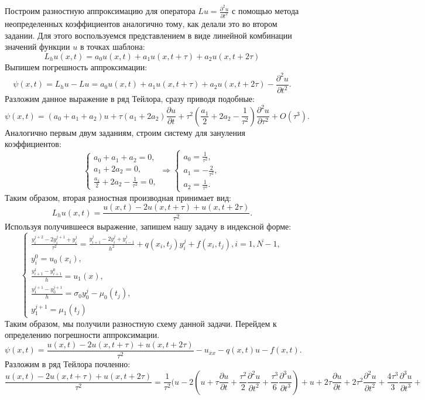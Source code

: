 \documentclass[11pt]{article}
\begin{document}
Построим разностную аппроксимацию для оператора $Lu=\frac{\partial^2 u}{\partial t^2}$ с помощью метода неопределенных коэффициентов аналогично тому, как делали это во втором задании. Для этого воспользуемся представлением в виде линейной комбинации значений функции $u$ в точках шаблона:
$$L_h u(x,t)=a_0u(x,t)+a_1u(x,t+\tau)+a_2u(x,t+2\tau)$$
Выпишем погрешность аппроксимации:
$$\psi(x,t)=L_hu-Lu=a_0u(x,t)+a_1u(x,t+\tau)+a_2u(x,t+2\tau)-\frac{\partial^2 u}{\partial t^2}.$$
Разложим данное выражение в ряд Тейлора, сразу приводя подобные:
$$\psi(x,t)=(a_0+a_1+a_2)u+\tau(a_1+2a_2)\frac{\partial u}{\partial t}+\tau^2(\frac{a_1}{2}+2a_2-\frac{1}{\tau^2})\frac{\partial^2 u}{\partial \tau^2}+O(\tau^3).$$
Аналогично первым двум заданиям, строим систему для зануления коэффициентов:
$$\begin{cases}
    a_0+a_1+a_2=0,\\
    a_1+2a_2=0,\\
    \frac{a_1}{2}+2a_2-\frac{1}{\tau^2}=0,
\end{cases}\Rightarrow
\begin{cases}
    a_0=\frac{1}{\tau^2},\\
    a_1=-\frac{2}{\tau^2},\\
    a_2=\frac{1}{\tau^2}.
\end{cases}$$
Таким образом, вторая разностная производная принимает вид:
$$L_hu(x,t)=\frac{u(x,t)-2u(x,t+\tau)+u(x,t+2\tau)}{\tau^2}.$$
Используя получившееся выражение, запишем нашу задачу в индексной форме:
$$\begin{cases}
    \frac{y_i^{j+2}-2y_i^{j+1}+y_{i}^j}{\tau^2}=\frac{y_{i+1}^j-2y_i^j+y_{i-1}^j}{h^2}+q(x_i,t_j)y_i^j+f(x_i,t_j),i=\overline{1,N-1},\\
    y_i^0=u_0(x_i),\\
    \frac{y_{i+1}^1-y_{i+1}^0}{h}=u_1(x),\\
    \frac{y_{1}^{j+1}-y_{0}^{j+1}}{h}=\sigma_0 y_0^{j}-\mu_0(t_j),\\
    y_{1}^{j+1}=\mu_1(t_j)
\end{cases}$$
Таким образом, мы получили разностную схему данной задачи. Перейдем к определению погрешности аппроксимации.
$$\psi(x,t)=\frac{u(x,t)-2u(x,t+\tau)+u(x,t+2\tau)}{\tau^2}-u_{\overline{x}x}-q(x,t)u-f(x,t).$$
Разложим в ряд Тейлора почленно:
$$\frac{u(x,t)-2u(x,t+\tau)+u(x,t+2\tau)}{\tau^2}=\frac{1}{\tau^2}(u-2(u+\tau\frac{\partial u}{\partial t}+\frac{\tau^2}{2}\frac{\partial^2 u}{\partial t^2}+\frac{\tau^3}{6}\frac{\partial^3 u}{\partial t^3})+u+2\tau \frac{\partial u}{\partial t}+2\tau^2 \frac{\partial^2 u}{\partial t^2}+\frac{4\tau^3}{3}\frac{\partial^3 u}{\partial t^3}+$$
\end{document}
